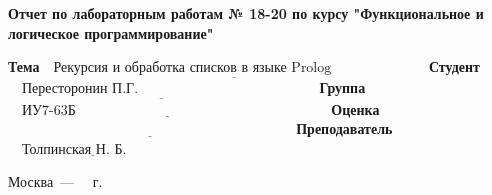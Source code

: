 \begin{titlepage}
    \begin{center}
        \Large\textbf{Отчет по лабораторным работам № 18-20 по курсу "Функциональное и логическое программирование"}
    \end{center}

    \noindent\textbf{Тема} $\underline{\text{~~Рекурсия и обработка списков в языке Prolog~~~~~~~~~~~~~~~~~~~~}}$\newline\newline\newline
    \noindent\textbf{Студент} $\underline{\text{~~~Пересторонин П.Г.~~~~~~~~~~~~~~~~~~~~~~~~~~~~~~~~~~~~~~}}$\newline\newline
    \noindent\textbf{Группа} $\underline{\text{~~~ИУ7-63Б~~~~~~~~~~~~~~~~~~~~~~~~~~~~~~~~~~~~~~~~~~~~~~~~~~~~~~}}$\newline\newline
    \noindent\textbf{Оценка} $\underline{\text{~~~~~~~~~~~~~~~~~~~~~~~~~~~~~~~~~~~~~~~~~~~~~~~~~~~~~~~~~~~~~}}$\newline\newline
    \noindent\textbf{Преподаватель} $\underline{\text{~~~Толпинская Н. Б.~~~~~~~~~~~}}$\newline

    \begin{center}
        \vfill
        Москва~---~\the\year
        ~г.
    \end{center}
    \restoregeometry
\end{titlepage}
